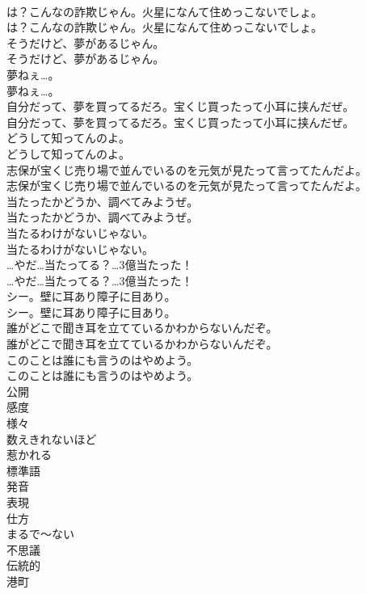 \documentclass[8pt]{extreport}
\begin{document}
\begin{CJK}{UTF8}{min}
\\	は？こんなの詐欺じゃん。火星になんて住めっこないでしょ。	
\\	は？こんなの詐欺じゃん。火星になんて住めっこないでしょ。 
\\	そうだけど、夢があるじゃん。	
\\	そうだけど、夢があるじゃん。 
\\	夢ねぇ…。	
\\	夢ねぇ…。 
\\	自分だって、夢を買ってるだろ。宝くじ買ったって小耳に挟んだぜ。	
\\	自分だって、夢を買ってるだろ。宝くじ買ったって小耳に挟んだぜ。 
\\	どうして知ってんのよ。	
\\	どうして知ってんのよ。 
\\	志保が宝くじ売り場で並んでいるのを元気が見たって言ってたんだよ。	
\\	志保が宝くじ売り場で並んでいるのを元気が見たって言ってたんだよ。 
\\	当たったかどうか、調べてみようぜ。	
\\	当たったかどうか、調べてみようぜ。 
\\	当たるわけがないじゃない。	
\\	当たるわけがないじゃない。 
\\	…やだ…当たってる？…3億当たった！	
\\	…やだ…当たってる？…3億当たった！ 
\\	シー。壁に耳あり障子に目あり。	
\\	シー。壁に耳あり障子に目あり。 
\\	誰がどこで聞き耳を立てているかわからないんだぞ。	
\\	誰がどこで聞き耳を立てているかわからないんだぞ。 
\\	このことは誰にも言うのはやめよう。	
\\	このことは誰にも言うのはやめよう。 
\\	公開
\\	感度
\\	様々
\\	数えきれないほど
\\	惹かれる
\\	標準語
\\	発音
\\	表現
\\	仕方
\\	まるで～ない
\\	不思議
\\	伝統的
\\	港町

\end{CJK}
\end{document}
